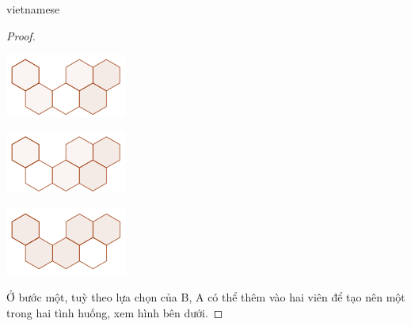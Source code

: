 \documentclass{article}
\begin{document}
\begin{otherlanguage*}{vietnamese}
\begin{proof}
    \begin{center}
        \centering
        \begin{minipage}[t]{4cm}
            \begin{center}
                \includegraphics[width=4cm]{./svg/pdf/pi-2024-1-p3-10a.pdf}
            \end{center}
        \end{minipage}
        \quad
        \begin{minipage}[t]{4cm}
            \begin{center}
                \includegraphics[width=4cm]{./svg/pdf/pi-2024-1-p3-10b.pdf}
            \end{center}
        \end{minipage}
        \qquad
        \begin{minipage}[t]{4cm}
            \begin{center}
                \includegraphics[width=4cm]{./svg/pdf/pi-2024-1-p3-10c.pdf}
            \end{center}
        \end{minipage}
    \end{center}

    Ở bước một, tuỳ theo lựa chọn của B, A có thể thêm vào hai viên để tạo nên một trong hai tình huống, xem hình bên dưới.


\end{proof}
\end{otherlanguage*}
\end{document}
